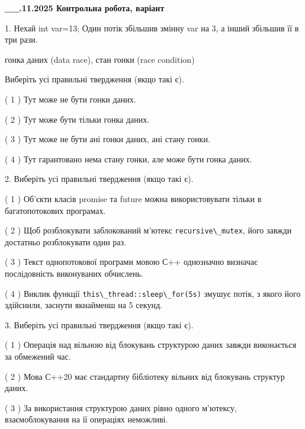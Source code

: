 \documentclass[12pt, ukrainian]{article}
\def\code#1{\Verb!#1!}
\begin{document}
\newpage
\begin {large}

\textbf{\_\_.11.2025 Контрольна робота, варіант  }\par


{
1. Нехай int var=13; Один потік збільшив змінну var на 3, а інший збільшив її в три рази.

гонка даних (data race), стан гонки (race condition)

Виберіть усі правильні твердження (якщо такі є).\par
\vspace{2mm}
( 1 ) Тут може не бути гонки даних.%

( 2 ) Тут може бути тільки гонка даних.%

( 3 ) Тут може не бути ані гонки даних, ані стану гонки.%

( 4 ) Тут гарантовано нема стану гонки, але може бути гонка даних.%


2. Виберіть усі правильні твердження (якщо такі є).\par
\vspace{2mm}

( 1 ) Об’єкти класів promise та future можна використовувати тільки в багатопотокових програмах.%

( 2 ) Щоб розблокувати заблокований м’ютекс \code{recursive\_mutex}, його завжди достатньо розблокувати один раз.%

( 3 ) Текст однопотокової програми мовою С++ однозначно визначає послідовність виконуваних обчислень.%

( 4 ) Виклик функції \code{this\_thread::sleep\_for(5s)} змушує потік, з якого його здійснили, заснути якнайменш на 5 секунд.%


3. Виберіть усі правильні твердження (якщо такі є).\par
\vspace{2mm}

( 1 ) Операція над вільною від блокувань структурою даних завжди виконається за обмежений час.%

( 2 ) Мова С++20 має стандартну бібліотеку вільних від блокувань структур даних.%

( 3 ) За використання структурою даних рівно одного м’ютексу, взаємоблокування на її операціях неможливі.%

}
\end{large}
\end{document}
